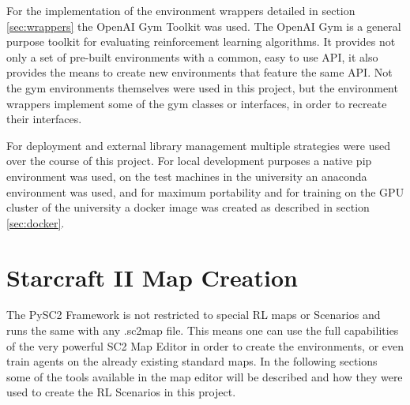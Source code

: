 For the implementation of the environment wrappers detailed in section \ref{sec:wrappers} the OpenAI Gym Toolkit was used. The OpenAI Gym is a general purpose toolkit for evaluating reinforcement learning algorithms. It provides not only a set of pre-built environments with a common, easy to use API, it also provides the means to create new environments that feature the same API.
Not the gym environments themselves were used in this project, but the environment wrappers implement some of the gym classes or interfaces, in order to recreate their interfaces.

For deployment and external library management multiple strategies were used over the course of this project.
For local development purposes a native pip environment was used, on the test machines in the university an anaconda environment was used, and for maximum portability and for training on the GPU cluster of the university a docker image was created as described in section \ref{sec:docker}.

\section{Starcraft II Map Creation}

\label{sec:mapedit}
The PySC2 Framework is not restricted to special RL maps or Scenarios and runs the same with any
.sc2map file. This means one can use the full capabilities of the very powerful SC2 Map Editor in order to create the environments, or even train agents on the already existing standard maps. In the following sections some of the tools available in the map editor will be described and how they were used to create the RL Scenarios in this project.
